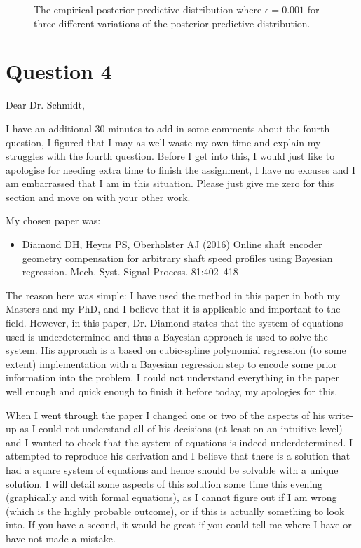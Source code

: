 \documentclass{article}
\begin{document}
\begin{figure}[htb!]
		\caption{The empirical posterior predictive distribution where $\epsilon = 0.001$ for three different variations of the posterior predictive distribution.}
		\label{fig:Q3_post_predict_samples}
	\end{figure}


	\clearpage
	
	\section{Question 4}
	
	Dear Dr. Schmidt, 
	
	I have an additional 30 minutes to add in some comments about the fourth question, I figured that I may as well waste my own time and explain my struggles with the fourth question. Before I get into this, I would just like to apologise for needing extra time to finish the assignment, I have no excuses and I am embarrassed that I am in this situation. Please just give me zero for this section and move on with your other work.
	
	My chosen paper was:
	\begin{itemize}
		\item Diamond DH, Heyns PS, Oberholster AJ (2016) Online shaft encoder geometry compensation for arbitrary shaft speed profiles using Bayesian regression. Mech. Syst. Signal Process. 81:402–418
	\end{itemize}
	
	The reason here was simple: I have used the method in this paper in both my Masters and my PhD, and I believe that it is applicable and important to the field. However, in this paper, Dr. Diamond states that the system of equations used is underdetermined and thus a Bayesian approach is used to solve the system. His approach is a based on cubic-spline polynomial regression (to some extent) implementation with a Bayesian regression step to encode some prior information into the problem. I could not understand everything in the paper well enough and quick enough to finish it before today, my apologies for this. 
	
	When I went through the paper I changed one or two of the aspects of his write-up as I could not understand all of his decisions (at least on an intuitive level) and I wanted to check that the system of equations is indeed underdetermined. I attempted to reproduce his derivation and I believe that there is a solution that had a square system of equations and hence should be solvable with a unique solution. I will detail some aspects of this solution some time this evening (graphically and with formal equations), as I cannot figure out if I am wrong (which is the highly probable outcome), or if this is actually something to look into. If you have a second, it would be great if you could tell me where I have or have not made a mistake.
	
\end{document}
